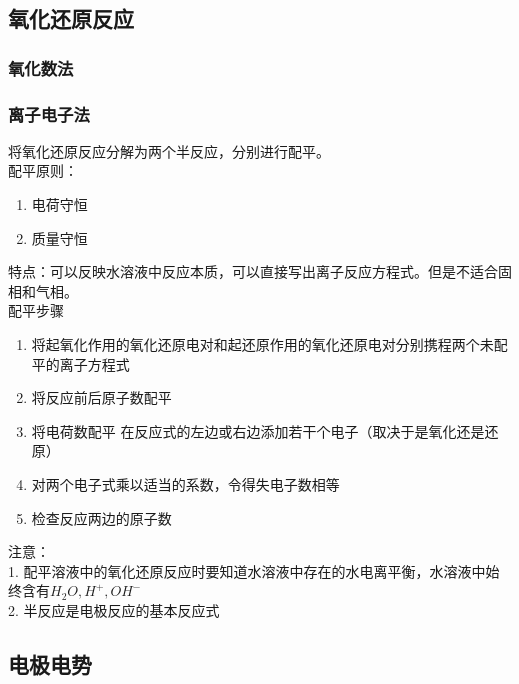 \documentclass[utf8,a4paper,12pt]{ctexart}
\begin{document}
\subsection{氧化还原反应}
\subsubsection{氧化数法}
\subsubsection{离子电子法}
将氧化还原反应分解为两个半反应，分别进行配平。\\
配平原则：\\
\begin{enumerate}
\item 电荷守恒
\item 质量守恒
\end{enumerate}
特点：可以反映水溶液中反应本质，可以直接写出离子反应方程式。但是不适合固相和气相。\\
配平步骤\\ 
\begin{enumerate}
\item 将起氧化作用的氧化还原电对和起还原作用的氧化还原电对分别携程两个未配平的离子方程式
\item 将反应前后原子数配平
\item 将电荷数配平
\subitem 在反应式的左边或右边添加若干个电子（取决于是氧化还是还原）
\item 对两个电子式乘以适当的系数，令得失电子数相等
\item 检查反应两边的原子数
\end{enumerate}
注意：\\
1. 配平溶液中的氧化还原反应时要知道水溶液中存在的水电离平衡，水溶液中始终含有$H_{2}O, H^{+}, OH^{-}$\\
2. 半反应是电极反应的基本反应式
\subsection{电极电势}
\end{document}
